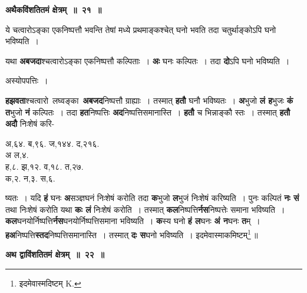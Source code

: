 \documentclass[11pt, openany]{book}
\begin{document}
\begin{center}
\textbf{\large अथैकविंशतितमं क्षेत्रम्~॥~२१~॥}
\end{center}

{\ab  ये चत्वारोऽङ्का एकनिष्पत्तौ भवन्ति तेषां मध्ये प्रथमाङ्कश्चेत् घनो भवति तदा चतुर्थाङ्कोऽपि घनो भविष्यति~। }

\newpage
यथा \textbf{अबजदा}श्चत्वारोऽङ्का एकनिष्पत्तौ कल्पिताः~। \textbf{अः} घनः कल्पितः~। तदा \textbf{दो}ऽपि घनो भविष्यति~। 

\begin{center}
अस्योपपत्तिः~।
\end{center}

\begin{flushleft}
\begin{minipage}[t]{0.55\textwidth}
\hspace{4mm} \textbf{हझवता}श्चत्वारो \,लघ्वङ्का \,\textbf{अबजद}निष्पत्तौ ग्राह्याः~। तस्मात् \textbf{हतौ} घनौ भविष्यतः~। \textbf{अ}भुजो \textbf{लं ह}भुजः \textbf{कं त}भुजो \textbf{नं} कल्पितः~। तदा \textbf{हत}निष्पत्तिः \textbf{अद}निष्पत्तिसमानास्ति~। \textbf{हतौ} च भिन्नाङ्कौ स्तः~। तस्मात् \textbf{हतौ} \textbf{अदौ} निःशेषं करि-
\end{minipage} 
\hfill
\begin{minipage}[t]{0.35\textwidth}
अ,६४. ब,९६. ज,१४४. द,२१६.\\
{\color{white}अ} ल,४.\\
ह,८. झ,१२. व,१८. त,२७.\\ 
क,२. न,३. स,६.
\end{minipage}
\end{flushleft}
\vspace{-3mm}

\noindent ष्यतः~। यदि \textbf{हं} घनः \textbf{अ}सञ्ज्ञघनं निःशेषं करोति तदा \textbf{क}भुजो \textbf{ल}भुजं निःशेषं करिष्यति~। पुनः कल्पितं \textbf{नः सं} तथा निःशेषं करोति यथा \textbf{कः लं} निःशेषं करोति~। तस्मात् \textbf{कल}निष्पत्ति\textbf{र्नस}निष्पत्तेः समाना भविष्यति~। \textbf{कल}घनयोर्निष्पत्ति\textbf{र्नस}घनयोर्निष्पत्तिसमाना भविष्यति~। \textbf{क}स्य घनो \textbf{हं ल}घनः \textbf{अं न}घनः \textbf{त}म्~। \textbf{हअ}निष्पत्ति\textbf{स्तद}निष्पत्तिसमानास्ति~। तस्मात् \textbf{दः स}घनो भविष्यति~। इदमेवास्माकमिष्टम्\renewcommand{\thefootnote}{१}\footnote{इदमेवास्मदिष्टम् {\en K.}}\,॥
\vspace{2mm}

\begin{center}
\textbf{\large अथ द्वाविंशतितमं क्षेत्रम्~॥~२२~॥} 
\end{center}
\end{document}
